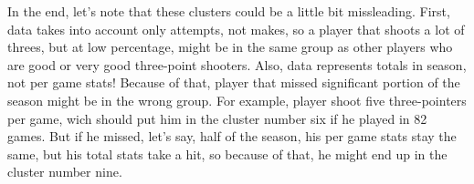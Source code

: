 \documentclass[a4paper]{article}
\begin{document}
In the end, let's note that these clusters could be a little bit missleading. First, data takes into account only attempts, not makes, so a player that shoots a lot of threes, but at low percentage, might be in the same group as other players who are good or very good three-point shooters. Also, data represents totals in season, not per game stats! Because of that, player that missed significant portion of the season might be in the wrong group. For example, player shoot five three-pointers per game, wich should put him in the cluster number six if he played in 82 games. But if he missed, let's say, half of the season, his per game stats stay the same, but his total stats take a hit, so because of that, he might end up in the cluster number nine.

\pagebreak

\appendix


\appendix
\end{document}
